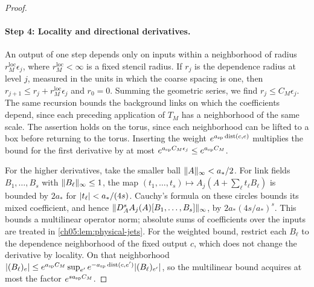 \begin{proof}
\paragraph{Step 4: Locality and directional derivatives.}
An output of one step depends only on inputs within a neighborhood of radius $r_M^{\mathrm{loc}}\epsilon_j$, where $r_M^{\mathrm{loc}}<\infty$ is a fixed stencil radius. If $r_j$ is the dependence radius at level $j$, measured in the units in which the coarse spacing is one, then $r_{j+1}\le r_j+r_M^{\mathrm{loc}}\epsilon_j$ and $r_0=0$. Summing the geometric series, we find $r_j\le C_M\epsilon_j$. The same recursion bounds the background links on which the coefficients depend, since each preceding application of $T_M$ has a neighborhood of the same scale. The assertion holds on the torus, since each neighborhood can be lifted to a box before returning to the torus. Inserting the weight $e^{a_{\mathrm{sp}}\operatorname{dist}(c,e)}$ multiplies the bound for the first derivative by at most $e^{a_{\mathrm{sp}} C_M\epsilon_j}\le e^{a_{\mathrm{sp}} C_M}$.

For the higher derivatives, take the smaller ball $\lVert A\rVert_\infty<a_*/2$. For link fields $B_1,\ldots,B_s$ with $\lVert B_\ell\rVert_\infty\le1$, the map $(t_1,\ldots,t_s)\mapsto A_j(A+\sum_\ell t_\ell B_\ell)$ is bounded by $2a_*$ for $\lvert t_\ell\rvert<a_*/(4s)$. Cauchy's formula on these circles bounds its mixed coefficient, and hence $\lVert D_A^sA_j(A)[B_1,\ldots,B_s]\rVert_\infty$, by $2a_*(4s/a_*)^s$. This bounds a multilinear operator norm; absolute sums of coefficients over the inputs are treated in \cref{ch05:lem:physical-jets}. For the weighted bound, restrict each $B_\ell$ to the dependence neighborhood of the fixed output $c$, which does not change the derivative by locality. On that neighborhood $\lvert (B_\ell)_e\rvert\le e^{a_{\mathrm{sp}} C_M}\sup_{e'}e^{-a_{\mathrm{sp}}\operatorname{dist}(c,e')}\lvert (B_\ell)_{e'}\rvert$, so the multilinear bound acquires at most the factor $e^{sa_{\mathrm{sp}} C_M}$.


\end{proof}
